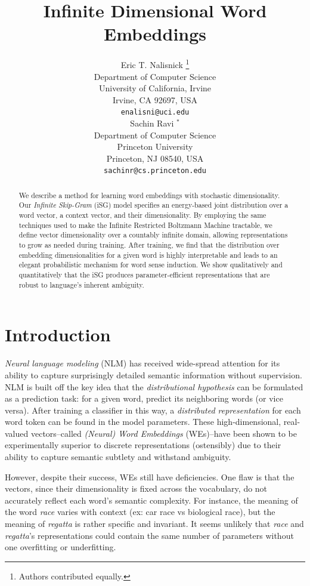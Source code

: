 \documentclass{article} %
\title{Infinite Dimensional Word Embeddings}
\author{Eric T. Nalisnick \thanks{ Authors contributed equally.} \\
Department of Computer Science\\
University of California, Irvine\\
Irvine, CA 92697, USA \\
\texttt{enalisni@uci.edu} \\
\And
Sachin Ravi $^{*}$\\
Department of Computer Science \\
Princeton University \\
Princeton, NJ 08540, USA \\
\texttt{sachinr@cs.princeton.edu} 
}
\begin{document}
\maketitle

\begin{abstract}
We describe a method for learning word embeddings with stochastic dimensionality. Our \textit{Infinite Skip-Gram} (iSG) model specifies an energy-based joint distribution over a word vector, a context vector, and their dimensionality.  By employing the same techniques used to make the Infinite Restricted Boltzmann Machine \citep{cote2015infinite} tractable, we define vector dimensionality over a countably infinite domain, allowing representations to grow as needed during training.  After training, we find that the distribution over embedding dimensionalities for a given word is highly interpretable and leads to an elegant probabilistic mechanism for word sense induction. We show qualitatively and quantitatively that the iSG produces parameter-efficient representations that are robust to language's inherent ambiguity.
\end{abstract}

\section{Introduction}
\textit{Neural language modeling} (NLM) \citep{bengio2003neural, mnih2009scalable, turian2010word, mikolov2013distributed} has received wide-spread attention for its ability to capture surprisingly detailed semantic information without supervision.  NLM is built off the key idea that the \textit{distributional hypothesis} \citep{harris1954distributional} can be formulated as a prediction task: for a given word, predict its neighboring words (or vice versa).  After training a classifier in this way, a \textit{distributed representation} for each word token can be found in the model parameters.  These high-dimensional, real-valued vectors--called \textit{(Neural) Word Embeddings} (WEs)--have been shown to be experimentally superior to discrete representations \citep{baroni2014don} (ostensibly) due to their ability to capture semantic subtlety and withstand ambiguity.

However, despite their success, WEs still have deficiencies.  One flaw is that the vectors, since their dimensionality is fixed across the vocabulary, do not accurately reflect each word's semantic complexity.  For instance, the meaning of the word \textit{race} varies with context (ex: car race vs biological race), but the meaning of \textit{regatta} is rather specific and invariant.  It seems unlikely that \textit{race} and \textit{regatta}'s representations could contain the same number of parameters without one overfitting or underfitting.  
\end{document}

